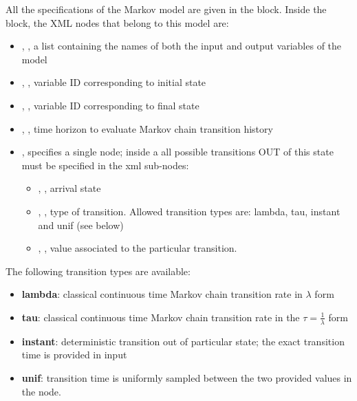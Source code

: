 All the specifications of the Markov model are given in the  block.
Inside the  block, the XML nodes that belong to this model are:
\begin{itemize}
  \item  {}, , a list containing the names of both the input and output variables of the model
  \item  {}, , variable ID corresponding to initial state
  \item  {}, , variable ID corresponding to final state
  \item  {}, , time horizon to evaluate Markov chain transition history
  \item  {}, specifies a single node; inside a  all possible transitions OUT of this state must be specified in the  xml sub-nodes:
	  \begin{itemize}
	  	\item {}, , arrival state
	    \item {}, , type of transition. Allowed transition types are:
      lambda, tau, instant and unif (see below)
	    \item {}, , value associated to the particular transition.
	  \end{itemize}
\end{itemize}

The following transition types are available:
\begin{itemize}
  \item \textbf{lambda}: classical continuous time Markov chain transition rate in $\lambda$ form
  \item \textbf{tau}: classical continuous time Markov chain transition rate in the $\tau = \frac{1}{\lambda}$ form
  \item \textbf{instant}: deterministic transition out of particular state; the exact transition time is provided in input
  \item \textbf{unif}: transition time is uniformly sampled between the two provided values in the  node.
\end{itemize}


